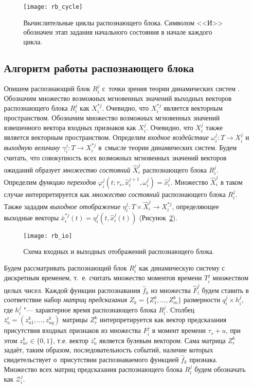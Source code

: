 \begin{figure}[h]
	\centering
	\texttt{[image: rb\_cycle]}
	\caption{Вычислительные циклы распознающего блока. Символом <<И>> обозначен этап задания начального состояния в начале каждого цикла.}
	\label{fig:rb_cycle}  
\end{figure}

\subsection{Алгоритм работы распознающего блока}\label{subsect:rb_algorithm}

Опишем распознающий блок $R_i^j$ с~точки зрения теории динамических систем \cite{KalmanE1971,Kalman1971}. Обозначим множество возможных мгновенных значений выходных векторов распознающего блока $R_i^j$ как $X_i^{*j}$. Очевидно, что $X_i^{*j}$ является векторным пространством. Обозначим множество возможных мгновенных значений взвешенного вектора входных признаков как $X_i^j$. Очевидно, что $X_i^j$ также является векторным пространством. Определим \textit{входное воздействие} $\omega_i^j:T{\to}X_i^j$ и \textit{выходную величину} $\gamma_i^j:T{\to}X_i^{*j}$ в~смысле теории динамических систем. Будем считать, что совокупность всех возможных мгновенных значений векторов ожиданий образует \textit{множество состояний} $\hat{X}_i^j$ распознающего блока $R_i^j$. Определим \textit{функцию переходов} $\varphi_i^j(t;\tau_s,\hat{x}_i^{j+1},\omega_i^j)=\hat{x}_i^j$. Множество $\hat{X}_i^j$ в таком случае интерпретируется как \textit{множество состояний} распознающего блока $R_i^j$. Также зададим \textit{выходное отображение} $\eta_i^j:T{\times}\hat{X}_i^j{\to}X_i^{*j}$, определяющее выходные векторы $\bar{x}_i^{*j}(t)=\eta_i^j(t,\hat{x}_i^j(t))$ (Рисунок~\ref{fig:rb_io}).

\begin{figure}[h]
	\centering
	\texttt{[image: rb\_io]}
	\caption{Схема входных и выходных отображений распознающего блока.}
	\label{fig:rb_io}
\end{figure}

Будем рассматривать распознающий блок $R_i^j$ как динамическую систему с дискретным временем, т.~е. считать множество моментов времени $T_i^j$ множеством целых чисел. Каждой функции распознавания $\hat{f}_k$ из множества $\hat{F}_i^j$ будем ставить в соответствие набор \textit{матриц предсказания} $Z_k=\{Z_1^k,…,Z_m^k\}$ размерности $q_i^j\times h_i^j$, где $h_i^j$ "--- характерное время распознающего блока $R_i^j$. Столбец $\bar{z}_u^r=(z_{u1}^k,…,z_{uq}^k)$ матрицы $Z_r^k$ интерпретируется как вектор предсказания присутствия входных признаков из множества $F_i^j$ в момент времени $\tau_s+u$, при этом $z_{uv}^k\in\{0,1\}$, т.е. вектор $\bar{z}_u^r$ является булевым вектором. Сама матрица $Z_r^k$ задаёт, таким образом, последовательность событий, наличие которых свидетельствует о~присутствии распознаваемого функцией $\hat{f}_k$ признака. Множество всех матриц предсказания распознающего блока $R_i^j$ будем обозначать как $\mathcal{Z}_i^j$.

